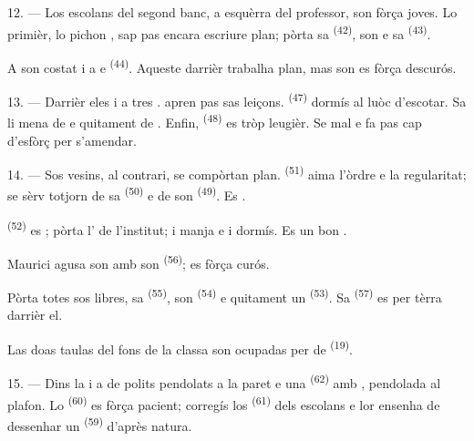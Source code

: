 12. --- Los escolans del segond banc, a esquèrra del professor, son fòrça joves.
Lo primièr, lo pichon , sap pas encara escriure plan; pòrta sa
 \textsuperscript{(42)}, son  e sa
 \textsuperscript{(43)}.

A son costat i a  e  \textsuperscript{(44)}.
Aqueste darrièr trabalha plan, mas son  es fòrça descurós.

13. --- Darrièr eles i a tres .  apren pas sas
leiçons.  \textsuperscript{(47)} dormís al luòc d'escotar. Sa
 li mena de  e quitament de
. Enfin,  \textsuperscript{(48)} es tròp
leugièr. Se  mal e fa pas cap d'esfòrç per s'amendar.

14. --- Sos vesins, al contrari, se compòrtan plan. 
\textsuperscript{(51)} aima l'òrdre e la regularitat; se sèrv totjorn de sa
 \textsuperscript{(50)} e de son 
\textsuperscript{(49)}. Es .

 \textsuperscript{(52)} es ; pòrta
l' de l'institut; i manja e i dormís. Es un bon
.

Maurici agusa son  amb son 
\textsuperscript{(56)}; es fòrça curós.

Pòrta totes sos libres, sa  \textsuperscript{(55)}, son
 \textsuperscript{(54)} e quitament un
 \textsuperscript{(53)}. Sa 
\textsuperscript{(57)} es per tèrra darrièr el.

Las doas taulas del fons de la classa son ocupadas per de 
\textsuperscript{(19)}.

\VUsaut{4.6mm}
\VUsaut{3.4mm}

15. --- Dins la  i a de polits  pendolats
a la paret e una  \textsuperscript{(62)} amb ,
pendolada al plafon. Lo  \textsuperscript{(60)} es fòrça
pacient; corregís los  \textsuperscript{(61)} dels escolans e lor
ensenha de dessenhar un  \textsuperscript{(59)} d'après natura.


